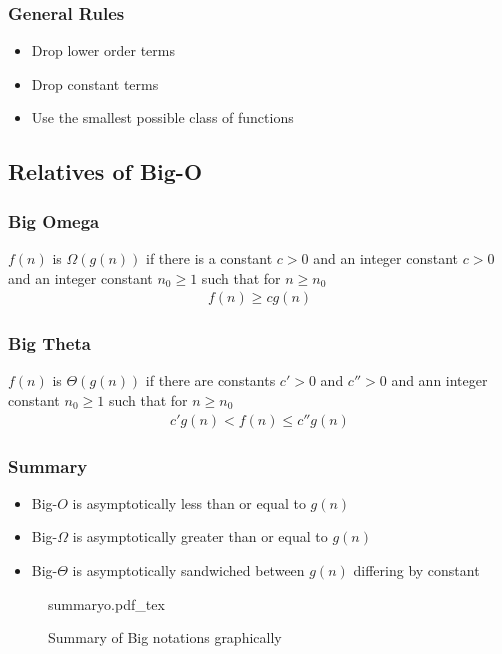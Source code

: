 \documentclass[a4paper]{article}
\newcommand{\incfig}[2][1]{%
    \def\svgwidth{#1\columnwidth}
    {#2.pdf_tex}
}
\theoremstyle{plain}
\theoremstyle{definition}
\newtheorem{defn}{Definition}[section]
\theoremstyle{remark}
\begin{document}
\subsubsection{General Rules}
\begin{itemize}
	\item Drop lower order terms
	\item Drop constant terms
	\item Use the smallest possible class of functions
\end{itemize}
\subsection{Relatives of Big-O}
\subsubsection{Big Omega}
\begin{tcolorbox}[colback=black!3!white,colframe=black!60!white,title=\begin{defn}Big Omega \label{Big Omega}\end{defn}]
$f( n)$ is $\Omega(g(n))$ if there is a constant $c > 0$ and an integer constant $c>0$ and an integer constant $n_0\ge 1$ such that for $n\ge n_0$
\begin{align}
f(n) \ge cg(n)
\end{align}
\end{tcolorbox}
\subsubsection{Big Theta}
\begin{tcolorbox}[colback=black!3!white,colframe=black!60!white,title=\begin{defn}Big Theta \label{Big Theta}\end{defn}]
$f(n)$ is $\Theta(g(n))$ if there are constants $c'>0$ and $c'' > 0$ and ann integer constant $n_0 \ge 1$ such that for $n \ge  n_0$
\begin{align}
c'g(n) <f(n) \le c''g(n)
\end{align}

\end{tcolorbox}
\subsubsection{Summary}
\begin{itemize}
	\item Big-$O$ is asymptotically less than or equal to $g(n)$ 
	\item Big-$\Omega$ is asymptotically greater than or equal to $g(n)$ 
	\item Big-$\Theta$ is asymptotically sandwiched between $g(n)$ differing by constant
\end{itemize}
\begin{figure}[H]
    \centering
    \incfig{summaryo}
    \caption{Summary of Big notations graphically}
    \label{fig:summaryo}
\end{figure}
\end{document}
